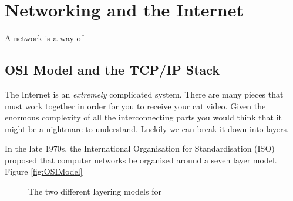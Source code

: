 \chapter{Networking and the Internet}

A network is a way of 

\section{OSI Model and the TCP/IP Stack}
The Internet is an \textit{extremely} complicated system. There are many pieces that must work together in order for you to receive your cat video. Given the enormous complexity of all the interconnecting parts you would think that it might be a nightmare to understand. Luckily we can break it down into layers. 

In the late 1970s, the International Organisation for Standardisation (ISO) proposed that computer networks be organised around a seven layer model. Figure \ref{fig:OSIModel}

\begin{figure}[h!]
	\centering
	\qquad\qquad
	\caption{\label{fig:FlynnsTaxo} The two different layering models for }
\end{figure}

